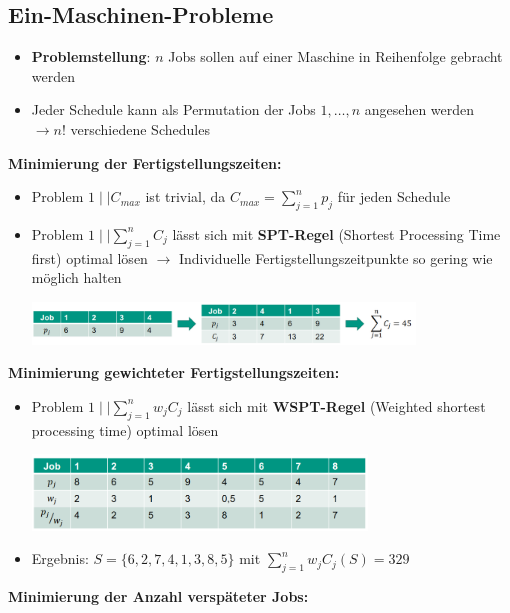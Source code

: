 \subsection{Ein-Maschinen-Probleme}
\begin{itemize}
	\item \textbf{Problemstellung}: $n$ Jobs sollen auf einer Maschine in
	Reihenfolge gebracht werden
	\item Jeder Schedule kann als Permutation der Jobs $1,\ldots,n$ angesehen
	werden \\
	$\rightarrow n!$ verschiedene Schedules
\end{itemize}
\bigskip
\textbf{Minimierung der Fertigstellungszeiten:}
\begin{itemize}
	\item Problem $1\mid\mid C_{max}$ ist trivial, da $C_{max}=\sum\limits_{j=1}^{n} p_j$ für jeden Schedule
	\item Problem $1\mid\mid \sum\limits_{j=1}^{n} C_j$ lässt sich mit \textbf{SPT-Regel} (Shortest Processing Time first) optimal lösen $\rightarrow$ Individuelle Fertigstellungszeitpunkte so gering wie möglich halten
	\begin{center}
		\includegraphics[width=0.8\textwidth]{images/spt.png}
	\end{center}
\end{itemize}
\bigskip
\textbf{Minimierung gewichteter Fertigstellungszeiten:}
\begin{itemize}
	\item Problem $1\mid\mid \sum\limits_{j=1}^{n} w_jC_j$ lässt sich mit \textbf{WSPT-Regel} (Weighted shortest processing time) optimal lösen
	\begin{center}
		\includegraphics[width=0.7\textwidth]{images/wspt.png}
	\end{center}
	\item Ergebnis: $S=\{6,2,7,4,1,3,8,5\}$ mit $\sum\limits_{j=1}^{n} w_jC_j(S)=329$
\end{itemize}
\bigskip
\textbf{Minimierung der Anzahl verspäteter Jobs:}
